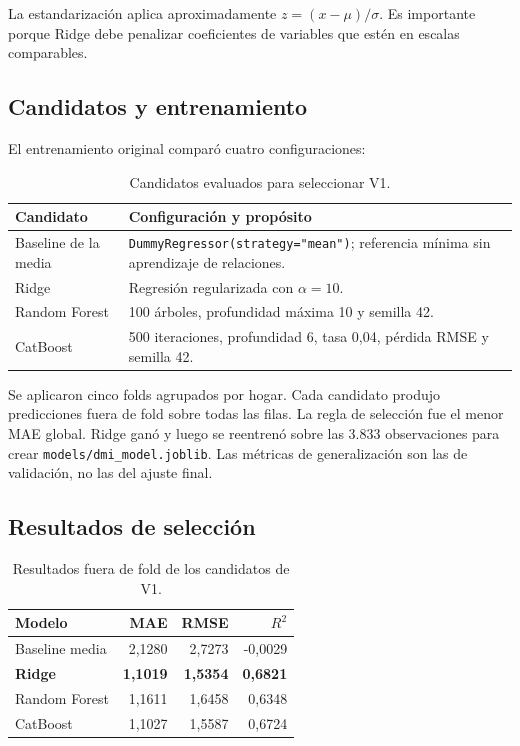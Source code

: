 \documentclass[11pt,a4paper]{article}
\newcommand{\codigo}[1]{\nolinkurl{#1}}
\begin{document}
La estandarización aplica aproximadamente $z=(x-\mu)/\sigma$. Es importante porque Ridge debe penalizar coeficientes de variables que estén en escalas comparables.

\subsection{Candidatos y entrenamiento}

El entrenamiento original comparó cuatro configuraciones:
\begin{table}[H]
\centering
\caption{Candidatos evaluados para seleccionar V1.}
\begin{tabularx}{\textwidth}{p{3.2cm}X}
\toprule
\textbf{Candidato} & \textbf{Configuración y propósito}\\
\midrule
Baseline de la media & \codigo{DummyRegressor(strategy="mean")}; referencia mínima sin aprendizaje de relaciones.\\
Ridge & Regresión regularizada con $\alpha=10$.\\
Random Forest & 100 árboles, profundidad máxima 10 y semilla 42.\\
CatBoost & 500 iteraciones, profundidad 6, tasa 0,04, pérdida RMSE y semilla 42.\\
\bottomrule
\end{tabularx}
\end{table}

Se aplicaron cinco folds agrupados por hogar. Cada candidato produjo predicciones fuera de fold sobre todas las filas. La regla de selección fue el menor MAE global. Ridge ganó y luego se reentrenó sobre las 3.833 observaciones para crear \codigo{models/dmi_model.joblib}. Las métricas de generalización son las de validación, no las del ajuste final.

\subsection{Resultados de selección}

\begin{table}[H]
\centering
\caption{Resultados fuera de fold de los candidatos de V1.}
\begin{tabular}{lrrr}
\toprule
\textbf{Modelo} & \textbf{MAE} & \textbf{RMSE} & \textbf{$R^2$}\\
\midrule
Baseline media & 2,1280 & 2,7273 & -0,0029\\
\textbf{Ridge} & \textbf{1,1019} & \textbf{1,5354} & \textbf{0,6821}\\
Random Forest & 1,1611 & 1,6458 & 0,6348\\
CatBoost & 1,1027 & 1,5587 & 0,6724\\
\bottomrule
\end{tabular}
\end{table}
\end{document}
